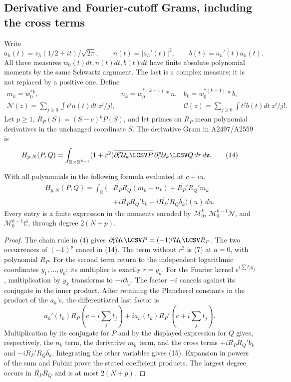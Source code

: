 \documentclass[10pt,a4paper,oneside]{report}
\begin{document}
\subsection{Derivative and Fourier-cutoff Grams, including the cross terms}
Write
\[
 a_h(t)=v_h(1/2+it)/\sqrt{2\pi},\qquad
 n(t)=|a_h'(t)|^2,\qquad
 b(t)=\overline{a_h'(t)}a_h(t).
 \tag{12}
\]
All three measures \(w_0(t)dt,n(t)dt,b(t)dt\) have finite absolute
polynomial moments by the same Schwartz argument. The last is a
complex measure; it is not replaced by a positive one. Define
\[
 \begin{array}{lll}
 m_k=w_0^{*k},&n_k=w_0^{*(k-1)}*n,&b_k=w_0^{*(k-1)}*b,\\
 \mathcal N(z)=\sum_{j\ge0}\int t^jn(t)dt\ z^j/j!,&&
 \mathcal C(z)=\sum_{j\ge0}\int t^jb(t)dt\ z^j/j!.
 \end{array}
 \tag{13}
\]
Let \(p\ge1\), \(R_P(S)=(S-c)^pP(S)\), and let primes on
\(R_P\) mean polynomial derivatives in the unchanged coordinate
\(S\). The derivative Gram in A2497/A2559 is
\[
 H_{p,N}(P,Q)=\int_{\mathbb R\times\mathbb R^{k-1}}
 (1+r^2)\overline{\partial_r^p\mathcal U_k\LCSV P}\,
                    \partial_r^p\mathcal U_k\LCSV Q\,dr\,d\mathbf z.
 \tag{14}
\]
\begin{latecontroltheorem}
With all polynomials in the following formula evaluated at \(c+iu\),
\[
 \begin{split}
 H_{p,N}(P,Q)=\int_{\mathbb R}\bigl(&
 \overline{R_P}R_Q(m_k+n_k)
 +\overline{R_P'}R_Q'm_k\\
 &+i\overline{R_P}R_Q'b_k
 -i\overline{R_P'}R_Q\overline{b_k}\bigr)(u)\,du.
 \end{split}
 \tag{15}
\]
Every entry is a finite expression in the moments encoded by
\(\mathcal M_0^k\), \(\mathcal M_0^{k-1}\mathcal N\), and
\(\mathcal M_0^{k-1}\mathcal C\), through degree \(2(N+p)\).
\end{latecontroltheorem}
\begin{proof}
The chain rule in (4) gives
\(\partial_r^p\mathcal U_k\LCSV P=(-1)^p\mathcal U_k\LCSV R_P\).
The two occurrences of \((-1)^p\) cancel in (14). The term without
\(r^2\) is (7) at \(a=0\), with polynomial \(R_P\).
For the second term return to the independent logarithmic coordinates
\(y_1,\ldots,y_k\); its multiplier is exactly \(r=y_k\).
For the Fourier kernel \(e^{i\sum t_jy_j}\), multiplication by
\(y_k\) transforms to \(-i\partial_{t_k}\). The factor \(-i\)
cancels against its conjugate in the inner product. After retaining
the Plancherel constants in the product of the \(a_h\)'s, the
differentiated last factor is
\[
 a_h'(t_k)R_P(c+i\textstyle\sum_jt_j)
 +i a_h(t_k)R_P'(c+i\textstyle\sum_jt_j).
\]
Multiplication by its conjugate for \(P\) and by the displayed
expression for \(Q\) gives, respectively, the \(n_k\) term, the
derivative \(m_k\) term, and the cross terms
\(+i\overline{R_P}R_Q'b_k\) and
\(-i\overline{R_P'}R_Q\overline{b_k}\). Integrating the other
variables gives (15). Expansion in powers of the sum and Fubini prove
the stated coefficient products. The largest degree occurs in
\(\overline{R_P}R_Q\) and is at most \(2(N+p)\).
\end{proof}
\end{document}
